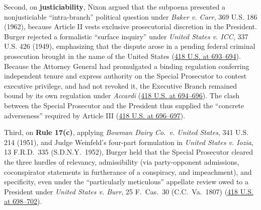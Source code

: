 \documentclass[12pt]{article}
\begin{document}
Second, on \textbf{justiciability}, Nixon argued that the subpoena presented a nonjusticiable ``intra-branch'' political question under \textit{Baker v. Carr}, 369 U.S. 186 (1962), because Article II vests exclusive prosecutorial discretion in the President. Burger rejected a formalistic ``surface inquiry'' under \textit{United States v. ICC}, 337 U.S. 426 (1949), emphasizing that the dispute arose in a pending federal criminal prosecution brought in the name of the United States (\href{https://supreme.justia.com/cases/federal/us/418/683/}{418 U.S. at 693--694}). Because the Attorney General had promulgated a binding regulation conferring independent tenure and express authority on the Special Prosecutor to contest executive privilege, and had not revoked it, the Executive Branch remained bound by its own regulation under \textit{Accardi} (\href{https://supreme.justia.com/cases/federal/us/418/683/}{418 U.S. at 694--696}). The clash between the Special Prosecutor and the President thus supplied the ``concrete adverseness'' required by Article III (\href{https://supreme.justia.com/cases/federal/us/418/683/}{418 U.S. at 696--697}).

Third, on \textbf{Rule 17(c)}, applying \textit{Bowman Dairy Co.\ v. United States}, 341 U.S. 214 (1951), and Judge Weinfeld's four-part formulation in \textit{United States v. Iozia}, 13 F.R.D.\ 335 (S.D.N.Y.\ 1952), Burger held that the Special Prosecutor cleared the three hurdles of relevancy, admissibility (via party-opponent admissions, coconspirator statements in furtherance of a conspiracy, and impeachment), and specificity, even under the ``particularly meticulous'' appellate review owed to a President under \textit{United States v. Burr}, 25 F.\ Cas.\ 30 (C.C.\ Va.\ 1807) (\href{https://supreme.justia.com/cases/federal/us/418/683/}{418 U.S. at 698--702}).
\end{document}
